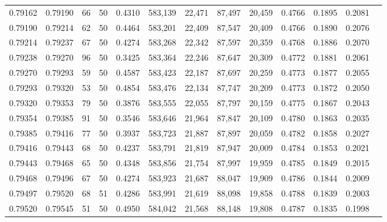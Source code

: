 \begin{tabular}{rrrrrrrrrrrrr}
0.79162 & 0.79190 &    66 &  50 &                                     0.4310 & 583,139 &  22,471 &  87,497 &  20,459 & 0.4766 & 0.1895 & 0.2081 \\
0.79190 & 0.79214 &    62 &  50 &                                     0.4464 & 583,201 &  22,409 &  87,547 &  20,409 & 0.4766 & 0.1890 & 0.2076 \\
0.79214 & 0.79237 &    67 &  50 &                                     0.4274 & 583,268 &  22,342 &  87,597 &  20,359 & 0.4768 & 0.1886 & 0.2070 \\
0.79238 & 0.79270 &    96 &  50 &                                     0.3425 & 583,364 &  22,246 &  87,647 &  20,309 & 0.4772 & 0.1881 & 0.2061 \\
0.79270 & 0.79293 &    59 &  50 &                                     0.4587 & 583,423 &  22,187 &  87,697 &  20,259 & 0.4773 & 0.1877 & 0.2055 \\
0.79293 & 0.79320 &    53 &  50 &                                     0.4854 & 583,476 &  22,134 &  87,747 &  20,209 & 0.4773 & 0.1872 & 0.2050 \\
0.79320 & 0.79353 &    79 &  50 &                                     0.3876 & 583,555 &  22,055 &  87,797 &  20,159 & 0.4775 & 0.1867 & 0.2043 \\
0.79354 & 0.79385 &    91 &  50 &                                     0.3546 & 583,646 &  21,964 &  87,847 &  20,109 & 0.4780 & 0.1863 & 0.2035 \\
0.79385 & 0.79416 &    77 &  50 &                                     0.3937 & 583,723 &  21,887 &  87,897 &  20,059 & 0.4782 & 0.1858 & 0.2027 \\
0.79416 & 0.79443 &    68 &  50 &                                     0.4237 & 583,791 &  21,819 &  87,947 &  20,009 & 0.4784 & 0.1853 & 0.2021 \\
0.79443 & 0.79468 &    65 &  50 &                                     0.4348 & 583,856 &  21,754 &  87,997 &  19,959 & 0.4785 & 0.1849 & 0.2015 \\
0.79468 & 0.79496 &    67 &  50 &                                     0.4274 & 583,923 &  21,687 &  88,047 &  19,909 & 0.4786 & 0.1844 & 0.2009 \\
0.79497 & 0.79520 &    68 &  51 &                                     0.4286 & 583,991 &  21,619 &  88,098 &  19,858 & 0.4788 & 0.1839 & 0.2003 \\
0.79520 & 0.79545 &    51 &  50 &                                     0.4950 & 584,042 &  21,568 &  88,148 &  19,808 & 0.4787 & 0.1835 & 0.1998 \\

\end{tabular}
